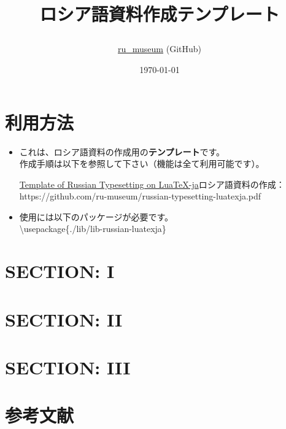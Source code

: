 \documentclass[a4paper,10pt]{ltjsarticle}
\title{
  \huge ロシア語資料作成テンプレート
\par\vspace{180mm}
}
\author{\href{https://github.com/ru-museum/}{ru\_museum} (GitHub)}
\date{\today}
\def\bs{\textbackslash }
\begin{document}
\maketitle

\thispagestyle{empty}
\clearpage

\newpage

{\makeatletter
\let\ps@jpl@in\ps@empty
\makeatother
\pagestyle{empty}
\tableofcontents
\clearpage}

  

\newpage
\addtocounter{page}{-3}

\section{利用方法}
\begin{itemize}
  \item これは、ロシア語資料の作成用の{\bfseries テンプレート}です。\\
作成手順は以下を参照して下さい（機能は全て利用可能です）。

\href{https://github.com/ru-museum/russian-typesetting-luatexja.pdf}{Template of Russian Typesetting on LuaTeX-ja}ロシア語資料の作成：\\
\hspace{6pt} https://github.com/ru-museum/russian-typesetting-luatexja.pdf
  \item 使用には以下のパッケージが必要です。\\
    \bs usepackage\{./lib/lib-russian-luatexja\}

\end{itemize}

\section{SECTION: I}

\newpage

\section{SECTION: II}

\newpage

\section{SECTION: III}

\newpage

\section{参考文献}
\end{document}
